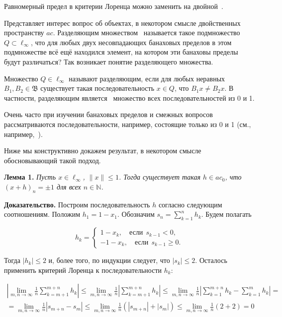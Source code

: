 \documentclass[a4paper,14pt]{article}
\begin{document}
Равномерный предел в критерии Лоренца можно заменить на двойной~\cite[Теорема 1]{zvol2022ac}.


Представляет интерес вопрос об объектах, в некотором смысле двойственных пространству $ac$.
Разделяющим множеством~\cite[\S 3]{Semenov2014geomprops}
называется такое
подмножество $Q \subset \ell_\infty$,
что для любых двух несовпадающих банаховых пределов в этом подмножестве всё ещё находился элемент,
на котором эти банаховы пределы будут различаться?
Так возникает понятие разделяющего множества.

Множество $Q\in\ell_\infty$ называют разделяющим, если
для любых неравных $B_1, B_2\in\mathfrak{B}$ существует такая последовательность $x\in Q$,
что $B_1 x \neq B_2 x$.
В частности, разделяющим является~\cite{semenov2010characteristic} множество всех последовательностей из 0 и 1.

Очень часто при изучении банаховых пределов и смежных вопросов
рассматриваются последовательности, например, состоящие только из 0 и 1
(см., например,~\cite{connor1990almost,our-mz2019ac0,avdeev2021vestnik,avdeev2021vmzprimes}).


Ниже мы конструктивно докажем результат,
в некотором смысле обосновывающий такой подход.


\medskip

\textbf{Лемма 1.}
{\sl
	Пусть $x\in\ell_\infty$, $\|x\|\leq 1$.
	Тогда существует такая $h\in ac_0$, что $(x+h)_n = \pm 1$ для всех $n\in\mathbb N$.
}

\textbf{Доказательство.}
Построим последовательность $h$ согласно следующим соотношениям.
Положим $h_1 = 1-x_1$.
Обозначим $s_n = \sum_{k=1}^n h_k$. Будем полагать

$$
	h_k = \begin{cases}
		1-x_k, \quad\mbox{если}~~ s_{k-1} < 0,
		\\
		-1 - x_k,\quad\mbox{если}~~ s_{k-1} \geq 0
		.
	\end{cases}
$$

Тогда $|h_k| \leq 2$ и, более того, по индукции следует, что $|s_k| \leq 2$. Осталось применить критерий Лоренца к последовательности $h_k$:

\begin{multline*}
	\left|\lim_{m,n\to \infty} \frac{1}{n} \sum_{k=m+1}^{m+n} h_k\right| \leq
	\lim_{m,n\to \infty} \frac{1}{n} \left|\sum_{k=m+1}^{m+n} h_k\right| \leq
	\lim_{m,n\to \infty} \frac{1}{n} \left|\sum_{k=1}^{m+n} h_k - \sum_{k=1}^{m} h_k  \right| =
	\\=
	\lim_{m,n\to \infty} \frac{1}{n} \left|s_{m+n} - s_{m}  \right| \leq
	\lim_{m,n\to \infty} \frac{1}{n} (|s_{m+n}| + |s_{m} |) \leq
	\lim_{m,n\to \infty} \frac{1}{n} (2 + 2) =0
\end{multline*}
\end{document}
